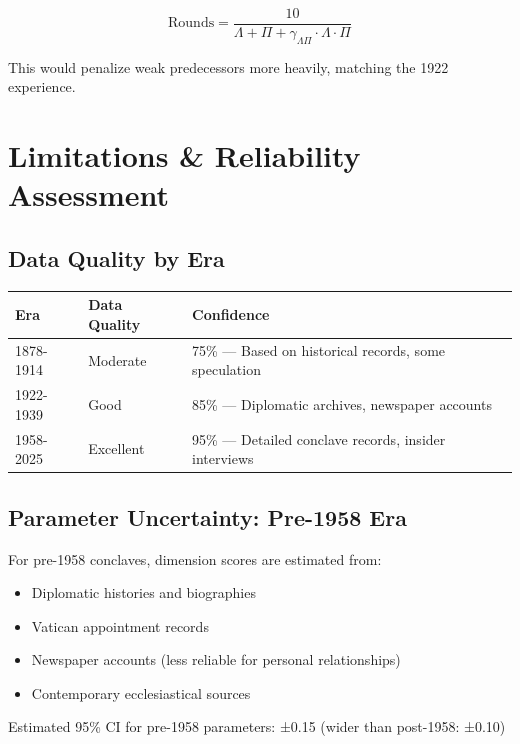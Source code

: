 \documentclass[11pt,a4paper]{article}
\begin{document}
\begin{equation}
\text{Rounds} = \frac{10}{\Lambda + \Pi + \gamma_{\Lambda\Pi} \cdot \Lambda \cdot \Pi}
\end{equation}

This would penalize weak predecessors more heavily, matching the 1922 experience.


\section{Limitations & Reliability Assessment}

\subsection{Data Quality by Era}

\begin{center}
\begin{tabular}{lll}
\toprule
\textbf{Era} & \textbf{Data Quality} & \textbf{Confidence} \\
\midrule
1878-1914 & Moderate & 75\% --- Based on historical records, some speculation \\
1922-1939 & Good & 85\% --- Diplomatic archives, newspaper accounts \\
1958-2025 & Excellent & 95\% --- Detailed conclave records, insider interviews \\
\bottomrule
\end{tabular}
\end{center}

\subsection{Parameter Uncertainty: Pre-1958 Era}

For pre-1958 conclaves, dimension scores are estimated from:
\begin{itemize}
    \item Diplomatic histories and biographies
    \item Vatican appointment records
    \item Newspaper accounts (less reliable for personal relationships)
    \item Contemporary ecclesiastical sources
\end{itemize}

Estimated 95\% CI for pre-1958 parameters: ±0.15 (wider than post-1958: ±0.10)
\end{document}
